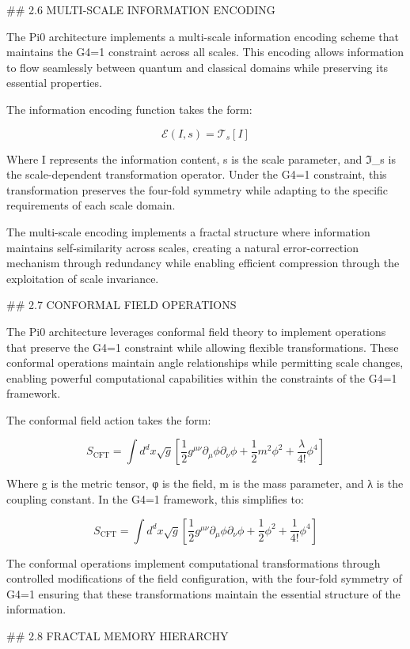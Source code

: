 ## 2.6 MULTI-SCALE INFORMATION ENCODING

The Pi0 architecture implements a multi-scale information encoding scheme that maintains the G4=1 constraint across all scales. This encoding allows information to flow seamlessly between quantum and classical domains while preserving its essential properties.

The information encoding function takes the form:

$$\mathcal{E}(I, s) = \mathcal{T}_s[I]$$

Where I represents the information content, s is the scale parameter, and ℑ_s is the scale-dependent transformation operator. Under the G4=1 constraint, this transformation preserves the four-fold symmetry while adapting to the specific requirements of each scale domain.

The multi-scale encoding implements a fractal structure where information maintains self-similarity across scales, creating a natural error-correction mechanism through redundancy while enabling efficient compression through the exploitation of scale invariance.

## 2.7 CONFORMAL FIELD OPERATIONS

The Pi0 architecture leverages conformal field theory to implement operations that preserve the G4=1 constraint while allowing flexible transformations. These conformal operations maintain angle relationships while permitting scale changes, enabling powerful computational capabilities within the constraints of the G4=1 framework.

The conformal field action takes the form:

$$S_{\text{CFT}} = \int d^dx \sqrt{g} \left[ \frac{1}{2}g^{\mu\nu}\partial_\mu\phi\partial_\nu\phi + \frac{1}{2}m^2\phi^2 + \frac{\lambda}{4!}\phi^4 \right]$$

Where g is the metric tensor, φ is the field, m is the mass parameter, and λ is the coupling constant. In the G4=1 framework, this simplifies to:

$$S_{\text{CFT}} = \int d^dx \sqrt{g} \left[ \frac{1}{2}g^{\mu\nu}\partial_\mu\phi\partial_\nu\phi + \frac{1}{2}\phi^2 + \frac{1}{4!}\phi^4 \right]$$

The conformal operations implement computational transformations through controlled modifications of the field configuration, with the four-fold symmetry of G4=1 ensuring that these transformations maintain the essential structure of the information.

## 2.8 FRACTAL MEMORY HIERARCHY

